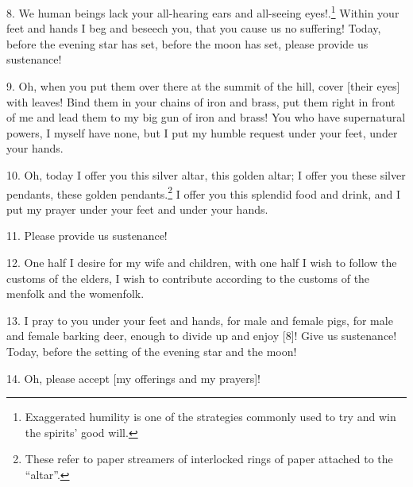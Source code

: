 8. We human beings lack your all-hearing ears and all-seeing eyes!.\footnote{Exaggerated humility is one of the strategies commonly used to try and win the spirits' good will.} Within
your feet and hands I beg and beseech you, that you cause us no suffering! Today,
before the evening star has set, before the moon has set, please provide us sustenance!

9. Oh, when you put them over there at the summit of the hill, cover [their eyes]
with leaves! Bind them in your chains of iron and brass, put them right in front
of me and lead them to my big gun of iron and brass! You who have supernatural
powers, I myself have none, but I put my humble request under your feet, under
your hands.

10. Oh, today I offer you this silver altar, this golden altar; I offer you these
silver pendants, these golden pendants.\footnote{These refer to paper streamers of interlocked rings of paper attached to the ``altar''.} I offer you this splendid food and
drink, and I put my prayer under your feet and under your hands.

11. Please provide us sustenance!

12. One half I desire for my wife and children, with one half I wish to follow the
customs of the elders, I wish to contribute according to the customs of the menfolk
and the womenfolk.

13. I pray to you under your feet and hands, for male and female pigs, for male
and female barking deer, enough to divide up and enjoy [8]! Give us sustenance!
Today, before the setting of the evening star and the moon!

14. Oh, please accept [my offerings and my prayers]!

